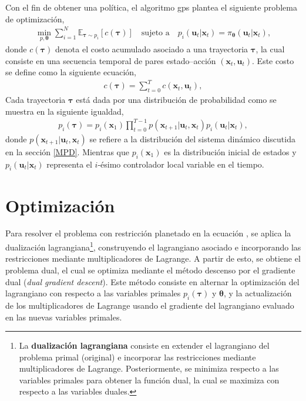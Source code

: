 Con el fin de obtener una política, el algoritmo \acrshort{gps} plantea el siguiente problema de optimización, 
 \begin{align}
    \min_{p, \bm\theta} \sum_{i=1}^{N}\mathbb{E}_{\bm\tau \sim p_{i}}\left[c(\bm\tau)\right] \quad \text{sujeto a} \quad p_{i}(\mathbf{u}_t|\mathbf{x}_t) = \pi_{\bm\theta}(\mathbf{u}_t|\mathbf{x}_t),
    \label{eq:gps_objective}
\end{align}
donde $c(\bm\tau)$ denota el costo acumulado asociado a una trayectoria 
$\bm\tau$, la cual consiste en una secuencia temporal de pares 
estado–acción $(\mathbf{x}_t, \mathbf{u}_t)$. Este costo se define como la siguiente ecuación,
\begin{align}
    c(\bm\tau) = \sum_{t=0}^{T} c(\mathbf{x}_t, \mathbf{u}_t),
    \label{eq:traj_cost}
\end{align}
Cada trayectoria $\bm\tau$ está dada por una distribución de probabilidad como se muestra en la siguiente igualdad,
\begin{align}
    p_{i}(\bm\tau) = p_{i}(\mathbf{x}_1)\prod_{t=0}^{T-1}p(\mathbf{x}_{t+1}|\mathbf{u}_t, \mathbf{x}_t)p_{i}(\mathbf{u}_t|\mathbf{x}_t),
    \label{eq:tray_dist}
\end{align}
donde $p(\mathbf{x}_{t+1}|\mathbf{u}_t, \mathbf{x}_t)$ se refiere a la distribución del sistema dinámico discutida en la sección \ref{MPD}. Mientras que $p_i(\mathbf{x}_1)$ es la distribución inicial de estados y  $p_i(\mathbf{u}_t|\mathbf{x}_t)$ representa el $i$-ésimo controlador local variable en el tiempo. 

\section{Optimización}
Para resolver el problema con restricción planetado en la ecuación , se aplica la dualización lagrangiana\footnote{La \textbf{dualización lagrangiana} consiste en extender el lagrangiano del problema primal (original) e incorporar las restricciones mediante multiplicadores de Lagrange. Posteriormente, se minimiza respecto a las variables primales para obtener la función dual, la cual se maximiza con respecto a las variables duales.\cite{boyd2004convex}}, construyendo el lagrangiano asociado e incorporando las restricciones mediante multiplicadores de Lagrange. A partir de esto, se obtiene el problema dual, el cual se optimiza mediante el método descenso por el gradiente dual (\textit{dual gradient descent}). Este método consiste en alternar la optimización del lagrangiano con respecto a las variables primales $p_i(\bm\tau)$ y $\bm\theta$, y la actualización de los multiplicadores de Lagrange usando el gradiente del lagrangiano evaluado en las nuevas variables primales. \cite{2014-mfcgps}

